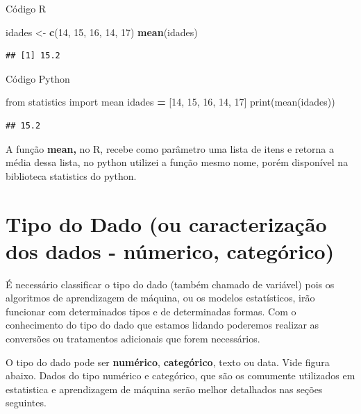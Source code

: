 \documentclass[
]{book}
\newenvironment{Shaded}{\begin{snugshade}}{\end{snugshade}}
\newcommand{\BuiltInTok}[1]{#1}
\newcommand{\DecValTok}[1]{\textcolor[rgb]{0.00,0.00,0.81}{#1}}
\newcommand{\FunctionTok}[1]{\textcolor[rgb]{0.13,0.29,0.53}{\textbf{#1}}}
\newcommand{\ImportTok}[1]{#1}
\newcommand{\NormalTok}[1]{#1}
\newcommand{\OperatorTok}[1]{\textcolor[rgb]{0.81,0.36,0.00}{\textbf{#1}}}
\newcommand{\OtherTok}[1]{\textcolor[rgb]{0.56,0.35,0.01}{#1}}
\begin{document}
Código R

\begin{Shaded}
\begin{Highlighting}[]
\NormalTok{idades }\OtherTok{\textless{}{-}} \FunctionTok{c}\NormalTok{(}\DecValTok{14}\NormalTok{, }\DecValTok{15}\NormalTok{, }\DecValTok{16}\NormalTok{, }\DecValTok{14}\NormalTok{, }\DecValTok{17}\NormalTok{)}
\FunctionTok{mean}\NormalTok{(idades)}
\end{Highlighting}
\end{Shaded}

\begin{verbatim}
## [1] 15.2
\end{verbatim}

Código Python

\begin{Shaded}
\begin{Highlighting}[]
\ImportTok{from}\NormalTok{ statistics }\ImportTok{import}\NormalTok{ mean }
\NormalTok{idades }\OperatorTok{=}\NormalTok{ [}\DecValTok{14}\NormalTok{, }\DecValTok{15}\NormalTok{, }\DecValTok{16}\NormalTok{, }\DecValTok{14}\NormalTok{, }\DecValTok{17}\NormalTok{]}
\BuiltInTok{print}\NormalTok{(mean(idades))}
\end{Highlighting}
\end{Shaded}

\begin{verbatim}
## 15.2
\end{verbatim}

A função \textbf{mean,} no R, recebe como parâmetro uma lista de itens e retorna a média dessa lista, no python utilizei a função mesmo nome, porém disponível na biblioteca statistics do python.

\section{Tipo do Dado (ou caracterização dos dados - númerico, categórico)}\label{tipo-do-dado-ou-caracterizauxe7uxe3o-dos-dados---nuxfamerico-categuxf3rico}

É necessário classificar o tipo do dado (também chamado de variável) pois os algoritmos de aprendizagem de máquina, ou os modelos estatísticos, irão funcionar com determinados tipos e de determinadas formas. Com o conhecimento do tipo do dado que estamos lidando poderemos realizar as conversões ou tratamentos adicionais que forem necessários.

O tipo do dado pode ser \textbf{numérico}, \textbf{categórico}, texto ou data. Vide figura abaixo. Dados do tipo numérico e categórico, que são os comumente utilizados em estatistica e aprendizagem de máquina serão melhor detalhados nas seções seguintes.
\end{document}
